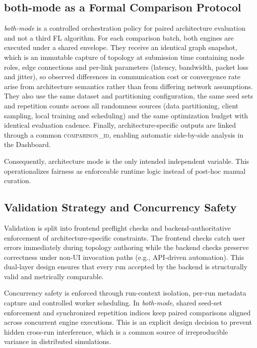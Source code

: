 \documentclass[conference]{IEEEtran}
\begin{document}
\subsection{both-mode as a Formal Comparison Protocol}
\textit{both-mode} is a controlled orchestration policy for paired architecture evaluation and not a third FL algorithm. For each comparison batch, both engines are executed under a shared envelope. They receive an identical graph snapshot, which is an immutable capture of topology at submission time containing node roles, edge connections and per-link parameters (latency, bandwidth, packet loss and jitter), so observed differences in communication cost or convergence rate arise from architecture semantics rather than from differing network assumptions. They also use the same dataset and partitioning configuration, the same seed sets and repetition counts across all randomness sources (data partitioning, client sampling, local training and scheduling) and the same optimization budget with identical evaluation cadence. Finally, architecture-specific outputs are linked through a common \textsc{comparison\_id}, enabling automatic side-by-side analysis in the Dashboard.

Consequently, architecture mode is the only intended independent variable. This operationalizes fairness as enforceable runtime logic instead of post-hoc manual curation.

\subsection{Validation Strategy and Concurrency Safety}
Validation is split into frontend preflight checks and backend-authoritative enforcement of architecture-specific constraints. The frontend checks catch user errors immediately during topology authoring while the backend checks preserve correctness under non-UI invocation paths (e.g., API-driven automation). This dual-layer design ensures that every run accepted by the backend is structurally valid and metrically comparable.

Concurrency safety is enforced through run-context isolation, per-run metadata capture and controlled worker scheduling. In \textit{both-mode}, shared seed-set enforcement and synchronized repetition indices keep paired comparisons aligned across concurrent engine executions. This is an explicit design decision to prevent hidden cross-run interference, which is a common source of irreproducible variance in distributed simulations.
\end{document}
